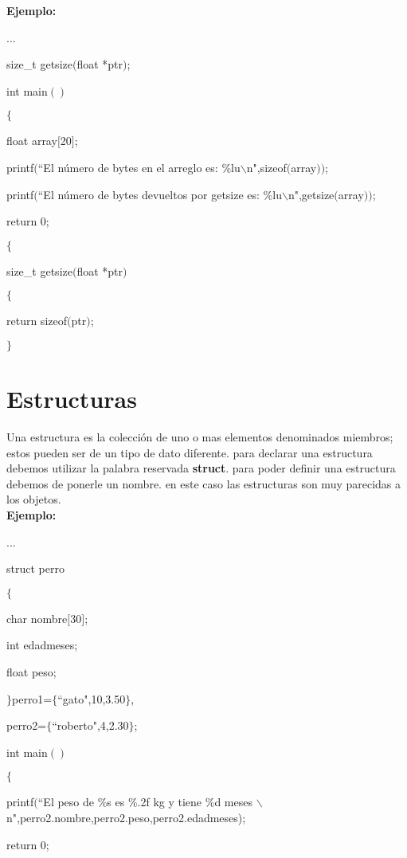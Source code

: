 \documentclass[]{article}
\begin{document}
	\textbf{Ejemplo:\\}
	
	...
	
	size\_t getsize$($float *ptr$)$;
	
	int main$()$
	
	$\lbrace$
	
	float array$\lbrack$20$\rbrack$;
	
	printf$($``El número de bytes en el arreglo es: \%lu$\backslash$n",sizeof$($array$))$;
	
	printf$($``El número de bytes devueltos por getsize es: \%lu$\backslash$n",getsize$($array$))$;
	
	return 0;
	
	$\lbrace$
	
	size\_t getsize$($float *ptr$)$
	
	$\lbrace$
	
	return sizeof$($ptr$)$;
	
	$\rbrace$
	
	\section{Estructuras}
	
	Una estructura es la colección de uno o mas elementos denominados miembros; estos pueden ser de un tipo de dato diferente. para declarar una estructura debemos utilizar la palabra reservada \textbf{struct}. para poder definir una estructura debemos de ponerle un nombre. en este caso las estructuras son muy parecidas a los objetos.\\
	
	\textbf{Ejemplo:\\}
	
	...
	
	struct perro
	
	$\lbrace$
	
	char nombre$[$30$]$;
	
	int edadmeses;
	
	float peso;
	
	$\rbrace$perro1=$\lbrace$``gato",10,3.50$\rbrace$,
	
	perro2=$\lbrace$``roberto",4,2.30$\rbrace$;
	
	int main$()$
	
	$\lbrace$
	
	printf$($``El peso de \%s es \%.2f kg y tiene \%d meses $\backslash$n",perro2.nombre,perro2.peso,perro2.edadmeses);
	
	return 0;
	
\end{document}

